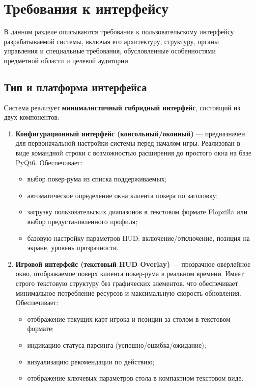 \section{Требования к интерфейсу}
\label{sec:interface_requirements}

В данном разделе описываются требования к пользовательскому интерфейсу разрабатываемой системы, включая его архитектуру, структуру, органы управления и специальные требования, обусловленные особенностями предметной области и целевой аудитории.

\subsection{Тип и платформа интерфейса}

Система реализует \textbf{минималистичный гибридный интерфейс}, состоящий из двух компонентов:

\begin{enumerate}
    \item \textbf{Конфигурационный интерфейс (консольный/оконный)} --- предназначен для первоначальной настройки системы перед началом игры. Реализован в виде командной строки с возможностью расширения до простого окна на базе PyQt6. Обеспечивает:
    \begin{itemize}
        \item выбор покер-рума из списка поддерживаемых;
        \item автоматическое определение окна клиента покера по заголовку;
        \item загрузку пользовательских диапазонов в текстовом формате Flopzilla или выбор предустановленного профиля;
        \item базовую настройку параметров HUD: включение/отключение, позиция на экране, уровень прозрачности.
    \end{itemize}
    
    \item \textbf{Игровой интерфейс (текстовый HUD Overlay)} --- прозрачное оверлейное окно, отображаемое поверх клиента покер-рума в реальном времени. Имеет строго текстовую структуру без графических элементов, что обеспечивает минимальное потребление ресурсов и максимальную скорость обновления. Обеспечивает:
    \begin{itemize}
        \item отображение текущих карт игрока и позиции за столом в текстовом формате;
        \item индикацию статуса парсинга (успешно/ошибка/ожидание);
        \item визуализацию рекомендации по действию;
        \item отображение ключевых параметров стола в компактном текстовом виде.
    \end{itemize}
\end{enumerate}

